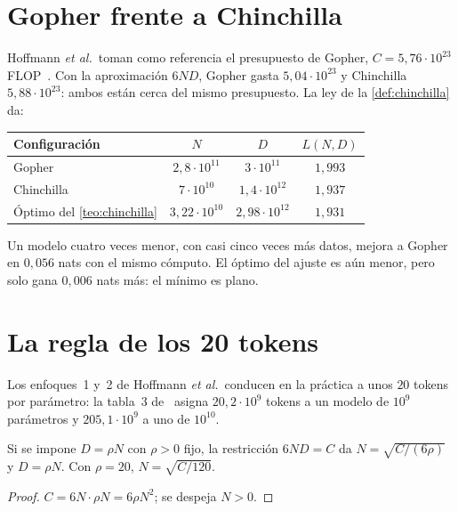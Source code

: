 \section{Gopher frente a Chinchilla}

\begin{ejemplo}\label{ej:gopher-chinchilla}
Hoffmann \emph{et al.}\ toman como referencia el presupuesto de Gopher, $C=5{,}76\cdot 10^{23}$ FLOP~\cite[tabla~3]{hoffmann}. Con la aproximación $6ND$, Gopher gasta $5{,}04\cdot 10^{23}$ y Chinchilla $5{,}88\cdot 10^{23}$: ambos están cerca del mismo presupuesto. La ley de la \cref{def:chinchilla} da:
\begin{center}\small
\begin{tabular}{@{}lccc@{}}
\toprule
Configuración & $N$ & $D$ & $L(N,D)$ \\
\midrule
Gopher & $2{,}8\cdot 10^{11}$ & $3\cdot 10^{11}$ & $1{,}993$ \\
Chinchilla & $7\cdot 10^{10}$ & $1{,}4\cdot 10^{12}$ & $1{,}937$ \\
Óptimo del \cref{teo:chinchilla} & $3{,}22\cdot 10^{10}$ & $2{,}98\cdot 10^{12}$ & $1{,}931$ \\
\bottomrule
\end{tabular}
\end{center}
Un modelo cuatro veces menor, con casi cinco veces más datos, mejora a Gopher en $0{,}056$ nats con el mismo cómputo. El óptimo del ajuste es aún menor, pero solo gana $0{,}006$ nats más: el mínimo es plano.
\end{ejemplo}

\section{La regla de los 20 tokens}

Los enfoques~1 y~2 de Hoffmann \emph{et al.}\ conducen en la práctica a unos $20$ tokens por parámetro: la tabla~3 de~\cite{hoffmann} asigna $20{,}2\cdot 10^{9}$ tokens a un modelo de $10^{9}$ parámetros y $205{,}1\cdot 10^{9}$ a uno de $10^{10}$.

\begin{proposicion}\label{prop:regla20}
Si se impone $D=\rho N$ con $\rho>0$ fijo, la restricción $6ND=C$ da $N=\sqrt{C/(6\rho)}$ y $D=\rho N$. Con $\rho=20$, $N=\sqrt{C/120}$.
\end{proposicion}

\begin{proof}
$C=6N\cdot\rho N=6\rho N^{2}$; se despeja $N>0$.
\end{proof}

